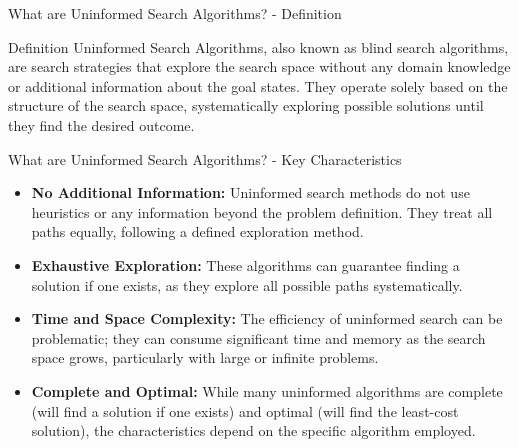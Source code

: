 \documentclass[aspectratio=169]{beamer}
\begin{document}
\begin{frame}[fragile]{What are Uninformed Search Algorithms? - Definition}
    \begin{block}{Definition}
        Uninformed Search Algorithms, also known as blind search algorithms, are search strategies that explore the search space without any domain knowledge or additional information about the goal states. 
        They operate solely based on the structure of the search space, systematically exploring possible solutions until they find the desired outcome.
    \end{block}
\end{frame}

\begin{frame}[fragile]{What are Uninformed Search Algorithms? - Key Characteristics}
    \begin{itemize}
        \item \textbf{No Additional Information:} 
            Uninformed search methods do not use heuristics or any information beyond the problem definition.
            They treat all paths equally, following a defined exploration method.
        
        \item \textbf{Exhaustive Exploration:} 
            These algorithms can guarantee finding a solution if one exists, as they explore all possible paths systematically.

        \item \textbf{Time and Space Complexity:} 
            The efficiency of uninformed search can be problematic; they can consume significant time and memory as the search space grows, particularly with large or infinite problems.

        \item \textbf{Complete and Optimal:} 
            While many uninformed algorithms are complete (will find a solution if one exists) and optimal (will find the least-cost solution), the characteristics depend on the specific algorithm employed.
    \end{itemize}
\end{frame}
\end{document}
